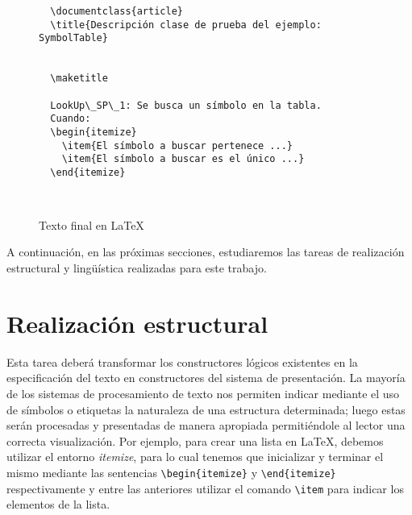 \begin{figure}[H]
  \begin{verbatim}
  \documentclass{article}
  \title{Descripción clase de prueba del ejemplo: SymbolTable}
  
  
  \maketitle

  LookUp\_SP\_1: Se busca un símbolo en la tabla.  
  Cuando:
  \begin{itemize}
    \item{El símbolo a buscar pertenece ...}
    \item{El símbolo a buscar es el único ...}   
  \end{itemize}
  
  
  \end{verbatim}
  \caption{Texto final en \LaTeX}
  \label{fig:ej_latex}
\end{figure}

A continuación, en las próximas secciones, estudiaremos las tareas de realización estructural y lingüística realizadas para este trabajo.

\section{Realización estructural}
\label{cap:structure_realization}


Esta tarea deberá transformar los constructores lógicos existentes en la especificación del texto en constructores del sistema de presentación. La mayoría de los sistemas de procesamiento de texto nos permiten indicar mediante el uso de símbolos o etiquetas la naturaleza de una estructura determinada; luego estas serán procesadas y presentadas de manera apropiada permitiéndole al lector una correcta visualización. Por ejemplo, para crear una lista en \LaTeX, debemos utilizar el entorno \emph{itemize}, para lo cual tenemos que inicializar y terminar el mismo mediante las sentencias \verb|\begin{itemize}| y \verb|\end{itemize}| respectivamente y entre las anteriores utilizar el comando \verb|\item| para indicar los elementos de la lista.

